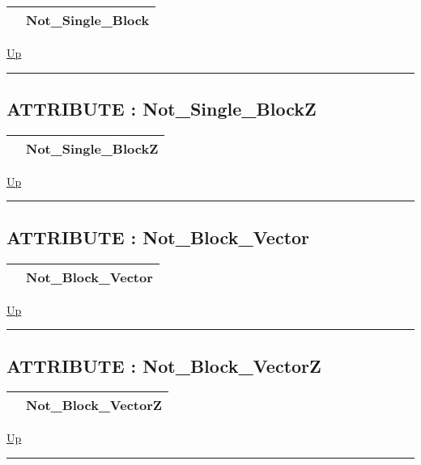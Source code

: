 {\renewcommand{\arraystretch}{1.5}
\begin{tabularx}{\textwidth}{|>{\raggedright\arraybackslash}l|X|}
\hline
\hspace{0pt} & Not\_Single\_Block \\
\hline
\end{tabularx}
}

\hyperlink{ecldoc:PBblas.Constants}{Up}

\par


\rule{\textwidth}{0.4pt}
\subsection*{ATTRIBUTE : Not\_Single\_BlockZ}
\hypertarget{ecldoc:pbblas.constants.not_single_blockz}{}

{\renewcommand{\arraystretch}{1.5}
\begin{tabularx}{\textwidth}{|>{\raggedright\arraybackslash}l|X|}
\hline
\hspace{0pt} & Not\_Single\_BlockZ \\
\hline
\end{tabularx}
}

\hyperlink{ecldoc:PBblas.Constants}{Up}

\par


\rule{\textwidth}{0.4pt}
\subsection*{ATTRIBUTE : Not\_Block\_Vector}
\hypertarget{ecldoc:pbblas.constants.not_block_vector}{}

{\renewcommand{\arraystretch}{1.5}
\begin{tabularx}{\textwidth}{|>{\raggedright\arraybackslash}l|X|}
\hline
\hspace{0pt} & Not\_Block\_Vector \\
\hline
\end{tabularx}
}

\hyperlink{ecldoc:PBblas.Constants}{Up}

\par


\rule{\textwidth}{0.4pt}
\subsection*{ATTRIBUTE : Not\_Block\_VectorZ}
\hypertarget{ecldoc:pbblas.constants.not_block_vectorz}{}

{\renewcommand{\arraystretch}{1.5}
\begin{tabularx}{\textwidth}{|>{\raggedright\arraybackslash}l|X|}
\hline
\hspace{0pt} & Not\_Block\_VectorZ \\
\hline
\end{tabularx}
}

\hyperlink{ecldoc:PBblas.Constants}{Up}

\par


\rule{\textwidth}{0.4pt}


